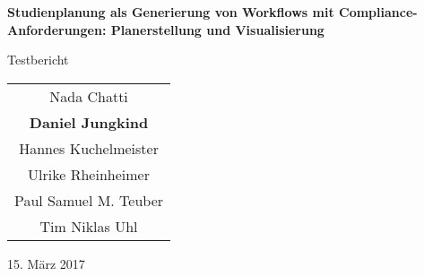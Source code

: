 \documentclass[titlepage=true, parskip=full]{scrartcl}
\newcommand{\+}{\discretionary{}{}{}}
\begin{document}
	
\begin{titlepage}
	\centering
	{\huge \bfseries \sffamily Studienplanung als Generierung von Workflows mit Compliance-Anforderungen: Planerstellung und Visualisierung\par}
	\vspace{1cm}
	{\LARGE Testbericht\par}
	\vfill
	\begin{tabular}{>{\Large}c}
		Nada Chatti\\
		\textbf{Daniel Jungkind}\\
		Hannes Kuchelmeister\\
		Ulrike Rheinheimer\\
		Paul Samuel M. Teuber\\
		Tim Niklas Uhl
	\end{tabular}
	\vfill
	15. März 2017
\end{titlepage}
\tableofcontents
\pagebreak

%













\newpage
\begin{appendices}
		
\end{appendices}
\end{document}
